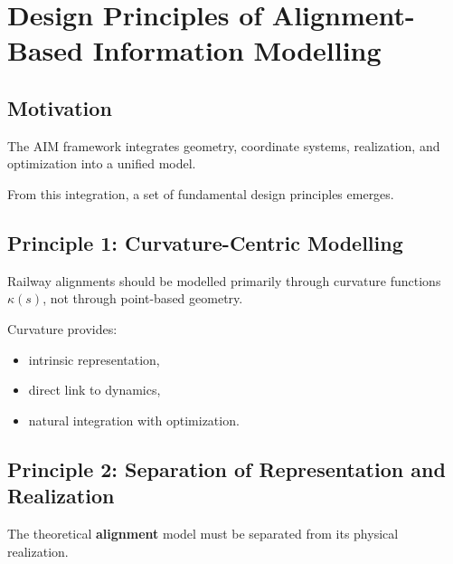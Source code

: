 
\section{Design Principles of Alignment-Based Information Modelling}

\subsection*{Motivation}

The AIM framework integrates geometry, coordinate systems, realization,
and optimization into a unified model.

From this integration, a set of fundamental design principles emerges.


\subsection{Principle 1: Curvature-Centric Modelling}

\begin{proposition}
Railway alignments should be modelled primarily through curvature
functions \(\kappa(s)\), not through point-based geometry.
\end{proposition}

Curvature provides:
\begin{itemize}
\item intrinsic representation,
\item direct link to dynamics,
\item natural integration with optimization.
\end{itemize}


\subsection{Principle 2: Separation of Representation and Realization}

\begin{proposition}
The theoretical \textbf{alignment} model must be separated from its physical
realization.
\end{proposition}

